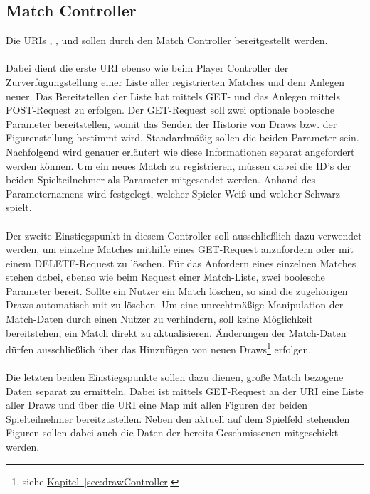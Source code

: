 \subsection{Match Controller}\label{sec:matchController}
Die \glspl{URI} , ,  und  sollen durch den Match Controller bereitgestellt werden.\\
\\
Dabei dient die erste \gls{URI} ebenso wie beim Player Controller der Zurverfügungstellung einer Liste aller registrierten Matches und dem Anlegen neuer. Das Bereitstellen der Liste hat mittels GET- und das Anlegen mittels POST-Request zu erfolgen. Der GET-Request soll zwei optionale boolesche Parameter bereitstellen, womit das Senden der Historie von Draws bzw. der Figurenstellung bestimmt wird. Standardmäßig sollen die beiden Parameter  sein. Nachfolgend wird genauer erläutert wie diese Informationen separat angefordert werden können. Um ein neues Match zu registrieren, müssen dabei die ID's der beiden Spielteilnehmer als Parameter mitgesendet werden. Anhand des Parameternamens wird festgelegt, welcher Spieler Weiß und welcher Schwarz spielt.\\
\\
Der zweite Einstiegspunkt in diesem Controller soll ausschließlich dazu verwendet werden, um einzelne Matches mithilfe eines GET-Request anzufordern oder mit einem DELETE-Request zu löschen. Für das Anfordern eines einzelnen Matches stehen dabei, ebenso wie beim Request einer Match-Liste, zwei boolesche Parameter bereit. Sollte ein Nutzer ein Match löschen, so sind die zugehörigen Draws automatisch mit zu löschen. Um eine unrechtmäßige Manipulation der Match-Daten durch einen Nutzer zu verhindern, soll keine Möglichkeit bereitstehen, ein Match direkt zu aktualisieren. Änderungen der Match-Daten dürfen ausschließlich über das Hinzufügen von neuen Draws\footnote{siehe \hyperref[sec:drawController]{Kapitel~\ref{sec:drawController}}} erfolgen.\\
\\
Die letzten beiden Einstiegspunkte sollen dazu dienen, große Match bezogene Daten separat zu ermitteln. Dabei ist mittels GET-Request an der \gls{URI}  eine Liste aller Draws und über die \gls{URI}  eine Map mit allen Figuren der beiden Spielteilnehmer bereitzustellen. Neben den aktuell auf dem Spielfeld stehenden Figuren sollen dabei auch die Daten der bereits Geschmissenen mitgeschickt werden.\\
